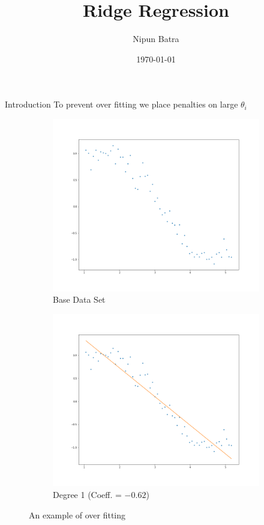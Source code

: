 \documentclass{beamer}
\title{Ridge Regression}
\date{\today}
\author{Nipun Batra}
\institute{IIT Gandhinagar}
\begin{document}
  \maketitle
  
\begin{frame}{Introduction}
\vspace{0.9cm}
To prevent over fitting we place penalties on large $\theta_i$
\pause
\vspace{-0.4cm}
\begin{figure}
        \begin{subfigure}[b]{0.5\textwidth}
                \includegraphics[width=\linewidth]{ridge/lin_1.png}
                \caption{Base Data Set}
        \end{subfigure}%
        \begin{subfigure}[b]{0.5\textwidth}
                \includegraphics[width=\linewidth]{ridge/lin_plot_1.png}
                \caption{Degree 1 (Coeff. = $-0.62$)}
        \end{subfigure}%
        \caption{An example of over fitting}
\end{figure}
\end{frame}  
\end{document}
